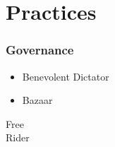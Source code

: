 \documentclass[18pt]{beamer}
\begin{document}
\section{Practices}

\begin{frame}
\frametitle{Governance}
\begin{itemize}
\item Benevolent Dictator
\pause
\item Bazaar
\end{itemize}
\end{frame}


{
\begin{frame}[plain]
\end{frame}
}



{
\color{white}
\begin{frame}[plain]
\fontsize{36pt}{36pt}\selectfont
\center
\begin{center}
Free\\
Rider
\end{center}
\end{frame}
}
\end{document}

